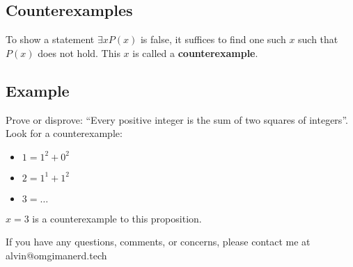 \documentclass[letterpaper, 12pt]{math}
\begin{document}
\subsection*{Counterexamples}
To show a statement \( \exists{x}P(x) \) is false, it suffices to find one such
\( x \) such that \( P(x) \) does not hold. This \( x \) is called a
\textbf{counterexample}.

\subsection*{Example}
Prove or disprove: ``Every positive integer is the sum of two squares of
integers''. Look for a counterexample:
\begin{itemize}
  \item \( 1 = 1^{2}+0^{2} \)
  \item \( 2 = 1^{1}+1^{2} \)
  \item \( 3 = \dots \)
\end{itemize}
\( x = 3 \) is a counterexample to this proposition.

\begin{center}
  If you have any questions, comments, or concerns, please contact me at
  alvin@omgimanerd.tech
\end{center}
\end{document}

